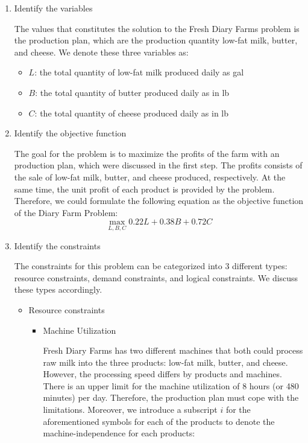 \documentclass[11pt]{article}
\begin{document}
\begin{enumerate}
\renewcommand{\labelenumii}{{\arabic{enumii}}}
\begin{enumerate}
    \item Identify the variables\par
    The values that constitutes the solution to the Fresh Diary Farms problem is the production plan, which are the production quantity low-fat milk, butter, and cheese. We denote these three variables as:
    \begin{itemize}
        \item $L$: the total quantity of low-fat milk produced daily as gal
        \item $B$: the total quantity of butter produced daily as in lb
        \item $C$: the total quantity of cheese produced daily as in lb
    \end{itemize}
    \item Identify the objective function\par
    The goal for the problem is to maximize the profits of the farm with an production plan, which were discussed in the first step. The profits consists of the sale of low-fat milk, butter, and cheese produced, respectively. At the same time, the unit profit of each product is provided by the problem. Therefore, we could formulate the following equation as the objective function of the Diary Farm Problem:
    $$
    \max_{L, B, C} 0.22L + 0.38B + 0.72C
    $$
    \item Identify the constraints\par
    The constraints for this problem can be categorized into 3 different types: resource constraints, demand constraints, and logical constraints. We discuss these types accordingly.
    
    \begin{itemize}
        \item Resource constraints\par
        \begin{itemize}
            \item Machine Utilization\par
            Fresh Diary Farms has two different machines that both could process raw milk into the three products: low-fat milk, butter, and cheese. However, the processing speed differs by products and machines. There is an upper limit for the machine utilization of 8 hours (or 480 minutes) per day. Therefore, the production plan must cope with the limitations. Moreover, we introduce a subscript $i$ for the aforementioned symbols for each of the products to denote the machine-independence for each products:
            

\end{itemize}
\end{itemize}
\end{enumerate}
\end{enumerate}
\end{document}
